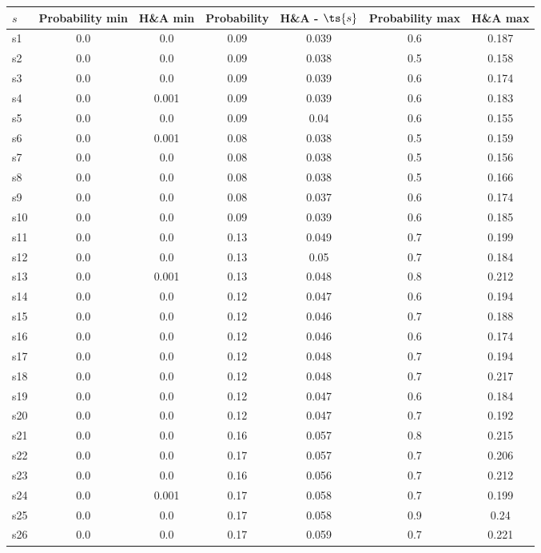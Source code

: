 \documentclass{article}
\begin{document}
\noindent\begin{tabular}{|l|c|c|c|c|c|c|}
\hline
$s$& Probability min & H\&A min & Probability & H\&A - $\ts{s}$ & Probability max & H\&A max\\
\hline
s1 &0.0 & 0.0 & 0.09 & 0.039 & 0.6 & 0.187\\
\hline
s2 &0.0 & 0.0 & 0.09 & 0.038 & 0.5 & 0.158\\
\hline
s3 &0.0 & 0.0 & 0.09 & 0.039 & 0.6 & 0.174\\
\hline
s4 &0.0 & 0.001 & 0.09 & 0.039 & 0.6 & 0.183\\
\hline
s5 &0.0 & 0.0 & 0.09 & 0.04 & 0.6 & 0.155\\
\hline
s6 &0.0 & 0.001 & 0.08 & 0.038 & 0.5 & 0.159\\
\hline
s7 &0.0 & 0.0 & 0.08 & 0.038 & 0.5 & 0.156\\
\hline
s8 &0.0 & 0.0 & 0.08 & 0.038 & 0.5 & 0.166\\
\hline
s9 &0.0 & 0.0 & 0.08 & 0.037 & 0.6 & 0.174\\
\hline
s10 &0.0 & 0.0 & 0.09 & 0.039 & 0.6 & 0.185\\
\hline
s11 &0.0 & 0.0 & 0.13 & 0.049 & 0.7 & 0.199\\
\hline
s12 &0.0 & 0.0 & 0.13 & 0.05 & 0.7 & 0.184\\
\hline
s13 &0.0 & 0.001 & 0.13 & 0.048 & 0.8 & 0.212\\
\hline
s14 &0.0 & 0.0 & 0.12 & 0.047 & 0.6 & 0.194\\
\hline
s15 &0.0 & 0.0 & 0.12 & 0.046 & 0.7 & 0.188\\
\hline
s16 &0.0 & 0.0 & 0.12 & 0.046 & 0.6 & 0.174\\
\hline
s17 &0.0 & 0.0 & 0.12 & 0.048 & 0.7 & 0.194\\
\hline
s18 &0.0 & 0.0 & 0.12 & 0.048 & 0.7 & 0.217\\
\hline
s19 &0.0 & 0.0 & 0.12 & 0.047 & 0.6 & 0.184\\
\hline
s20 &0.0 & 0.0 & 0.12 & 0.047 & 0.7 & 0.192\\
\hline
s21 &0.0 & 0.0 & 0.16 & 0.057 & 0.8 & 0.215\\
\hline
s22 &0.0 & 0.0 & 0.17 & 0.057 & 0.7 & 0.206\\
\hline
s23 &0.0 & 0.0 & 0.16 & 0.056 & 0.7 & 0.212\\
\hline
s24 &0.0 & 0.001 & 0.17 & 0.058 & 0.7 & 0.199\\
\hline
s25 &0.0 & 0.0 & 0.17 & 0.058 & 0.9 & 0.24\\
\hline
s26 &0.0 & 0.0 & 0.17 & 0.059 & 0.7 & 0.221\\

\end{tabular}
\end{document}
